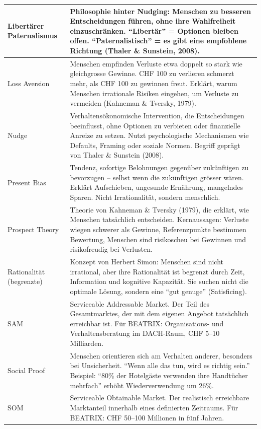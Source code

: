 \documentclass[11pt,a4paper]{article}
\begin{document}
\begin{longtable}{@{}L{4cm}L{10cm}@{}}
\midrule
Libertärer Paternalismus & Philosophie hinter Nudging: Menschen zu besseren Entscheidungen führen, ohne ihre Wahlfreiheit einzuschränken. ``Libertär'' = Optionen bleiben offen. ``Paternalistisch'' = es gibt eine empfohlene Richtung (Thaler \& Sunstein, 2008). \\
\midrule
Loss Aversion & Menschen empfinden Verluste etwa doppelt so stark wie gleichgrosse Gewinne. CHF 100 zu verlieren schmerzt mehr, als CHF 100 zu gewinnen freut. Erklärt, warum Menschen irrationale Risiken eingehen, um Verluste zu vermeiden (Kahneman \& Tversky, 1979). \\
\midrule
Nudge & Verhaltensökonomische Intervention, die Entscheidungen beeinflusst, ohne Optionen zu verbieten oder finanzielle Anreize zu setzen. Nutzt psychologische Mechanismen wie Defaults, Framing oder soziale Normen. Begriff geprägt von Thaler \& Sunstein (2008). \\
\midrule
Present Bias & Tendenz, sofortige Belohnungen gegenüber zukünftigen zu bevorzugen -- selbst wenn die zukünftigen grösser wären. Erklärt Aufschieben, ungesunde Ernährung, mangelndes Sparen. Nicht Irrationalität, sondern menschlich. \\
\midrule
Prospect Theory & Theorie von Kahneman \& Tversky (1979), die erklärt, wie Menschen tatsächlich entscheiden. Kernaussagen: Verluste wiegen schwerer als Gewinne, Referenzpunkte bestimmen Bewertung, Menschen sind risikoscheu bei Gewinnen und risikofreudig bei Verlusten. \\
\midrule
Rationalität (begrenzte) & Konzept von Herbert Simon: Menschen sind nicht irrational, aber ihre Rationalität ist begrenzt durch Zeit, Information und kognitive Kapazität. Sie suchen nicht die optimale Lösung, sondern eine ``gut genuge'' (Satisficing). \\
\midrule
SAM & Serviceable Addressable Market. Der Teil des Gesamtmarktes, der mit dem eigenen Angebot tatsächlich erreichbar ist. Für BEATRIX: Organisations- und Verhaltensberatung im DACH-Raum, CHF 5--10 Milliarden. \\
\midrule
Social Proof & Menschen orientieren sich am Verhalten anderer, besonders bei Unsicherheit. ``Wenn alle das tun, wird es richtig sein.'' Beispiel: ``80\% der Hotelgäste verwenden ihre Handtücher mehrfach'' erhöht Wiederverwendung um 26\%. \\
\midrule
SOM & Serviceable Obtainable Market. Der realistisch erreichbare Marktanteil innerhalb eines definierten Zeitraums. Für BEATRIX: CHF 50--100 Millionen in fünf Jahren. \\

\end{longtable}
\end{document}
